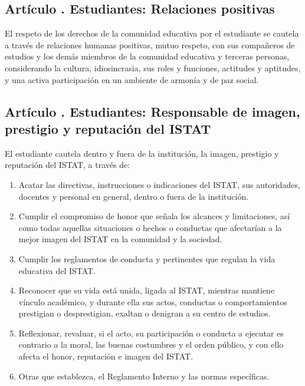 \subsection{Artículo . Estudiantes: Relaciones positivas}
\addtocounter{ns}{1}
El respeto de los derechos de la comunidad educativa por el estudiante se cautela a través de relaciones humanas positivas, mutuo respeto, con sus compañeros de estudios y los demás miembros de la comunidad educativa y terceras personas, considerando la cultura, idiosincrasia, sus roles y funciones, actitudes y aptitudes, y una activa participación en un ambiente de armonía y de paz social. 
\subsection{Artículo . Estudiantes: Responsable de imagen, prestigio y reputación del ISTAT}
\addtocounter{ns}{1}
El estudiante cautela dentro y fuera de la institución, la imagen, prestigio y reputación del ISTAT, a través de: 
\begin{enumerate}
\item Acatar las directivas, instrucciones o indicaciones del ISTAT, sus autoridades, docentes y personal en general, dentro o fuera de la institución. 
\item Cumplir el compromiso de honor que señala los alcances y limitaciones, así como todas aquellas situaciones o hechos o conductas que afectarían a la mejor imagen del ISTAT en la comunidad y la sociedad.  
\item Cumplir los reglamentos de conducta y pertinentes que regulan la vida educativa del ISTAT. 
\item Reconocer que su vida está unida, ligada al ISTAT, mientras mantiene vínculo académico, y durante ella sus actos, conductas o comportamientos prestigian o desprestigian, exaltan o denigran a su centro de estudios. 
\item Reflexionar, revaluar, si el acto, su participación o conducta a ejecutar es contrario a la moral, las buenas costumbres y el orden público, y con ello afecta el honor, reputación e imagen del ISTAT. 
\item Otras que establezca, el Reglamento Interno y las normas específicas. 
\end{enumerate}

